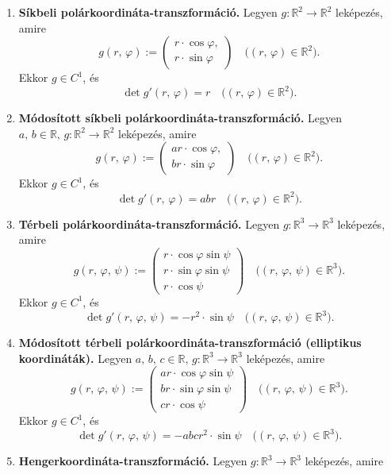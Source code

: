 \documentclass{article}
\newcommand{\R}{\mathbb{R}}
\begin{document}
	\begin{enumerate}
		\item \textbf{Síkbeli polárkoordináta-transzformáció.} Legyen $g : \R^2 \to \R^2$ leképezés, amire
		\[
			g(r, \, \varphi) := \begin{pmatrix}
				r \cdot \cos \varphi, \\
				r \cdot \sin \varphi
			\end{pmatrix} \quad \big( (r, \, \varphi) \in \R^2 \big).
		\]
		Ekkor $g \in C^1$, és
		\[
			\det g'(r, \, \varphi) = r \quad \big( (r, \, \varphi) \in \R^2 \big).
		\]
		\item \textbf{Módosított síkbeli polárkoordináta-transzformáció.} Legyen $a, \, b \in \R, \, g : \R^2 \to \R^2$ leképezés, amire
		\[
			g(r, \, \varphi) := \begin{pmatrix}
				ar \cdot \cos \varphi, \\
				br \cdot \sin \varphi
			\end{pmatrix} \quad \big( (r, \, \varphi) \in \R^2 \big).
		\]
		Ekkor $g \in C^1$, és
		\[
			\det g'(r, \, \varphi) = abr \quad \big( (r, \, \varphi) \in \R^2 \big).
		\]
		\item \textbf{Térbeli polárkoordináta-transzformáció.} Legyen $g : \R^3 \to \R^3$ leképezés, amire
		\[
			g(r, \, \varphi, \, \psi) := \begin{pmatrix}
				r \cdot \cos \varphi \sin \psi \\
				r \cdot \sin \varphi \sin \psi \\
				r \cdot \cos \psi
			\end{pmatrix} \quad \big( (r, \, \varphi, \, \psi) \in \R^3\big).
		\]
		Ekkor $g \in C^1$, és
		\[
			\det g'(r, \, \varphi, \, \psi) = -r^2 \cdot \sin \psi \quad \big( (r, \, \varphi, \, \psi) \in \R^3\big).
		\]
		\item \textbf{Módosított térbeli polárkoordináta-transzformáció (elliptikus koordináták).} Legyen $a, \, b, \, c \in \R, \, g : \R^3 \to \R^3$ leképezés, amire
		\[
			g(r, \, \varphi, \, \psi) := \begin{pmatrix}
				ar \cdot \cos \varphi \sin \psi \\
				br \cdot \sin \varphi \sin \psi \\
				cr \cdot \cos \psi
			\end{pmatrix} \quad \big( (r, \, \varphi, \, \psi) \in \R^3\big).
		\]
		Ekkor $g \in C^1$, és
		\[
			\det g'(r, \, \varphi, \, \psi) = -abcr^2 \cdot \sin \psi \quad \big( (r, \, \varphi, \, \psi) \in \R^3\big).
		\]
		\item \textbf{Hengerkoordináta-transzformáció.} Legyen $g : \R^3 \to \R^3$ leképezés, amire

\end{enumerate}
\end{document}
